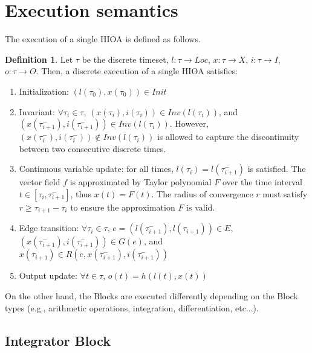 \documentclass[twoside,a4paper,12pt]{article}
\theoremstyle{definition}
\newtheorem{definition}{Definition}
\begin{document}
\section{Execution semantics}
The execution of a single HIOA is defined as follows.
\begin{definition}
Let $\tau$ be the discrete timeset, $l : \tau \rightarrow Loc$, $x : \tau \rightarrow X$, $i : \tau \rightarrow I$, $o: \tau \rightarrow O$. Then, a discrete execution of a single HIOA satisfies:
	\begin{enumerate}
		\item Initialization: $(l(\tau_0), x(\tau_0)) \in Init$
		\item Invariant: $\forall \tau_i \in \tau$, $(x(\tau_i), i(\tau_i)) \in Inv(l(\tau_i))$, and $(x(\tau_{i+1}^-), i(\tau_{i+1}^-)) \in Inv(l(\tau_i))$. However, $(x(\tau_i^-), i(\tau_i^-)) \notin Inv(l(\tau_i))$ is allowed to capture the discontinuity between two consecutive discrete times.
		\item Continuous variable update: for all times, $l(\tau_i) = l(\tau_{i+1}^-)$ is satisfied. The vector field $f$ is approximated by Taylor polynomial $F$ over the time interval $t \in [\tau_i, \tau_{i+1}^-]$, thus $x(t) = F(t)$. The radius of convergence $r$ must satisfy $r \geq \tau_{i+1} - \tau_i$ to ensure the approximation $F$ is valid.
		\item Edge transition: $\forall \tau_i \in \tau$, $e = (l(\tau_{i+1}^-), l(\tau_{i+1})) \in E$, $(x(\tau_{i+1}^-), i(\tau_{i+1}^-))\in G(e)$, and $x(\tau_{i+1}) \in R(e, x(\tau_{i+1}^-), i(\tau_{i+1}^-))$
		\item Output update: $\forall t \in \tau$, $o(t) = h( l(t), x(t) )$
	\end{enumerate}
\end{definition}

On the other hand, the Blocks are executed differently depending on the Block types (e.g., arithmetic operations, integration, differentiation, etc...).

\subsection{Integrator Block}
\end{document}
